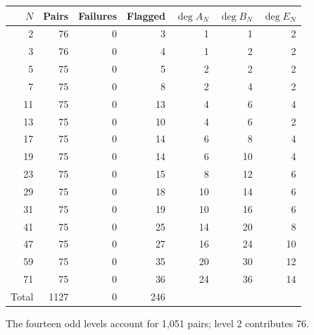 \begin{center}
\begin{tabular}{rrrrrrr}
\toprule
$N$ & Pairs & Failures & Flagged & $\deg A_N$ & $\deg B_N$ & $\deg E_N$\\
\midrule
2 & 76 & 0 & 3 & 1 & 1 & 2\\
3 & 76 & 0 & 4 & 1 & 2 & 2\\
5 & 75 & 0 & 5 & 2 & 2 & 2\\
7 & 75 & 0 & 8 & 2 & 4 & 2\\
11 & 75 & 0 & 13 & 4 & 6 & 4\\
13 & 75 & 0 & 10 & 4 & 6 & 2\\
17 & 75 & 0 & 14 & 6 & 8 & 4\\
19 & 75 & 0 & 14 & 6 & 10 & 4\\
23 & 75 & 0 & 15 & 8 & 12 & 6\\
29 & 75 & 0 & 18 & 10 & 14 & 6\\
31 & 75 & 0 & 19 & 10 & 16 & 6\\
41 & 75 & 0 & 25 & 14 & 20 & 8\\
47 & 75 & 0 & 27 & 16 & 24 & 10\\
59 & 75 & 0 & 35 & 20 & 30 & 12\\
71 & 75 & 0 & 36 & 24 & 36 & 14\\
\midrule
Total & 1127 & 0 & 246 & & &\\
\bottomrule
\end{tabular}
\end{center}
The fourteen odd levels account for 1,051 pairs; level 2 contributes 76.

